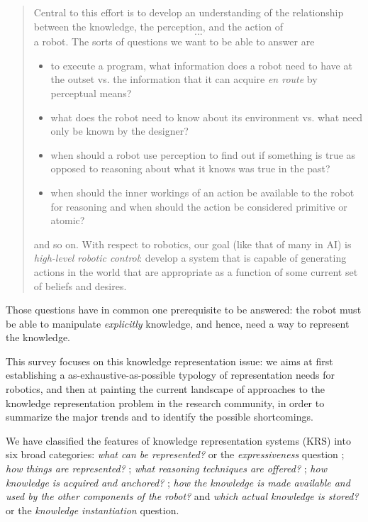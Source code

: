 \documentclass[a4paper, twocolumn]{article}
\begin{document}
\begin{quotation}

    Central to this effort is to develop an understanding of the relationship
    between the knowledge, the perception, and the action of \[...\] a robot. The
    sorts of questions we want to be able to answer are

    \begin{itemize} 

        \item to execute a program, what information does a robot need to have
        at the outset vs. the information that it can acquire \emph{en route}
        by perceptual means?

        \item what does the robot need to know about its environment vs. what
        need only be known by the designer?

        \item when should a robot use perception to find out if something is
        true as opposed to reasoning about what it knows was true in the past?

        \item when should the inner workings of an action be available to the
        robot for reasoning and when should the action be considered primitive
        or atomic?

    \end{itemize}

    and so on. With respect to robotics, our goal (like that of many in AI) is
    \emph{high-level robotic control}: develop a system that is capable of
    generating actions in the world that are appropriate as a function of some
    current set of beliefs and desires.

\end{quotation}

Those questions have in common one prerequisite to be answered: the robot must
be able to manipulate \emph{explicitly} knowledge, and hence, need a way to
represent the knowledge.

This survey focuses on this knowledge representation issue: we aims at first
establishing a as-exhaustive-as-possible typology of representation needs for
robotics, and then at painting the current landscape of approaches to the
knowledge representation problem in the research community, in order to
summarize the major trends and to identify the possible shortcomings.

We have classified the features of knowledge representation systems (KRS) into
six broad categories: \emph{what can be represented?} or the
\emph{expressiveness} question ; \emph{how things are represented?} ; \emph{what
reasoning techniques are offered?} ; \emph{how knowledge is acquired and
anchored?} ; \emph{how the knowledge is made available and used by the other
components of the robot?} and \emph{which actual knowledge is stored?} or the
\emph{knowledge instantiation} question.
\end{document}
